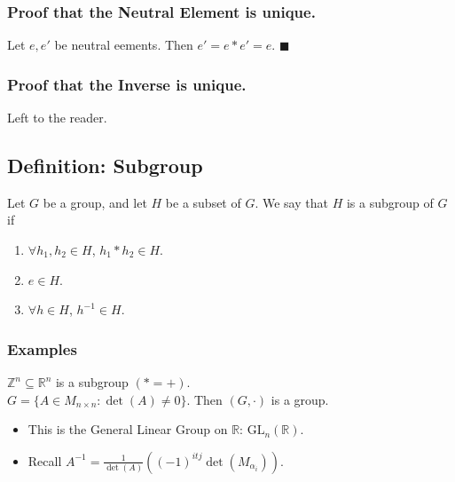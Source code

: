 \documentclass[11pt]{article}
\newcommand{\0}{\emptyset}
\newcommand{\Z}{\mathbb{Z}}
\newcommand{\R}{\mathbb{R}}
\begin{document}
\subsubsection*{Proof that the Neutral Element is unique.}
\label{sec:org7d5dbce}
Let \(e,e'\) be neutral eements. Then \(e'=e*e'=e\). \(\blacksquare\)\\[0pt]
\subsubsection*{Proof that the Inverse is unique.}
\label{sec:org7f7b069}
Left to the reader.\\[0pt]
\subsection*{Definition: Subgroup}
\label{sec:org60efe1f}
Let \(G\) be a group, and let \(H\) be a subset of \(G\). We say that \(H\) is a subgroup of \(G\) if\\[0pt]
\begin{enumerate}
\item \(\forall h_{1},h_{2}\in H\), \(h_{1}*h_{2}\in H\).\\[0pt]
\item \(e\in H\).\\[0pt]
\item \(\forall h\in H\), \(h^{-1}\in H\).\\[0pt]
\end{enumerate}
\subsubsection*{Examples}
\label{sec:orgfa3ed21}
\(\Z^{n}\subseteq \R^{n}\) is a subgroup \((*=+)\).\\[0pt]
\(G=\{A\in M_{n\times n}:\det(A)\neq 0\}\). Then \((G,\cdot)\) is a group.\\[0pt]
\begin{itemize}
\item This is the General Linear Group on \(\R\): \(\text{GL}_{n}(\R)\).\\[0pt]
\item Recall \(A^{-1}=\frac{1}{\det(A)}\left( (-1)^{itj}\det(M_{\alpha_{i}}) \right)\).\\[0pt]
\end{itemize}
\end{document}
